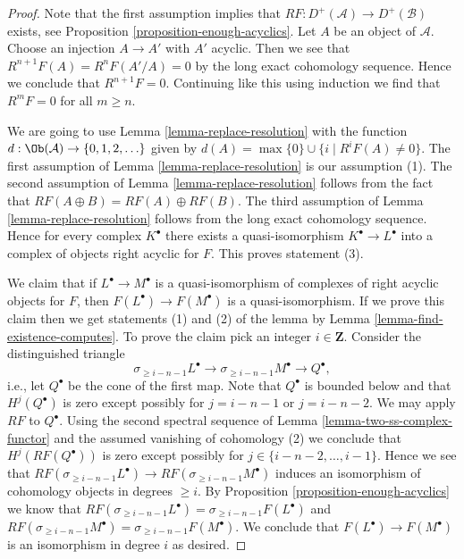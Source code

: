 \begin{proof}
Note that the first assumption implies that
$RF : D^+(\mathcal{A}) \to D^+(\mathcal{B})$ exists, see
Proposition \ref{proposition-enough-acyclics}.
Let $A$ be an object of $\mathcal{A}$. Choose an injection $A \to A'$
with $A'$ acyclic. Then we see that $R^{n + 1}F(A) = R^nF(A'/A) = 0$ by
the long exact cohomology sequence. Hence we conclude that $R^{n + 1}F = 0$.
Continuing like this using induction we find that $R^mF = 0$ for all
$m \geq n$.

\medskip\noindent
We are going to use Lemma \ref{lemma-replace-resolution} with the function
$d : \Ob(\mathcal{A}) \to \{0, 1, 2, \ldots \}$ given by
$d(A) = \max \{0\} \cup \{i \mid R^iF(A) \not = 0\}$.
The first assumption of Lemma \ref{lemma-replace-resolution}
is our assumption (1). The second assumption of
Lemma \ref{lemma-replace-resolution} follows from the fact
that $RF(A \oplus B) = RF(A) \oplus RF(B)$. The third assumption of
Lemma \ref{lemma-replace-resolution} follows from the long exact
cohomology sequence. Hence for every complex $K^\bullet$ there exists a
quasi-isomorphism $K^\bullet \to L^\bullet$ into a complex of
objects right acyclic for $F$. This proves statement (3).

\medskip\noindent
We claim that if $L^\bullet \to M^\bullet$ is a quasi-isomorphism of
complexes of right acyclic objects for $F$, then
$F(L^\bullet) \to F(M^\bullet)$
is a quasi-isomorphism. If we prove this claim then we get statements
(1) and (2) of the lemma by
Lemma \ref{lemma-find-existence-computes}.
To prove the claim pick an integer $i \in \mathbf{Z}$.
Consider the distinguished triangle
$$
\sigma_{\geq i - n - 1}L^\bullet \to
\sigma_{\geq i - n - 1}M^\bullet \to Q^\bullet,
$$
i.e., let $Q^\bullet$ be the cone of the first map.
Note that $Q^\bullet$ is bounded below and that
$H^j(Q^\bullet)$ is zero except possibly for $j = i - n - 1$
or $j = i - n - 2$. We may apply $RF$ to $Q^\bullet$.
Using the second spectral sequence of
Lemma \ref{lemma-two-ss-complex-functor}
and the assumed vanishing of cohomology (2) we conclude
that $H^j(RF(Q^\bullet))$ is zero except possibly for
$j \in \{i - n - 2, \ldots, i - 1\}$. Hence we see that
$RF(\sigma_{\geq i - n - 1}L^\bullet) \to RF(\sigma_{\geq i - n - 1}M^\bullet)$
induces an isomorphism of cohomology objects in degrees $\geq i$.
By Proposition \ref{proposition-enough-acyclics} we know that
$RF(\sigma_{\geq i - n - 1}L^\bullet) = \sigma_{\geq i - n - 1}F(L^\bullet)$
and
$RF(\sigma_{\geq i - n - 1}M^\bullet) = \sigma_{\geq i - n - 1}F(M^\bullet)$.
We conclude that $F(L^\bullet) \to F(M^\bullet)$
is an isomorphism in degree $i$ as desired.


\end{proof}
